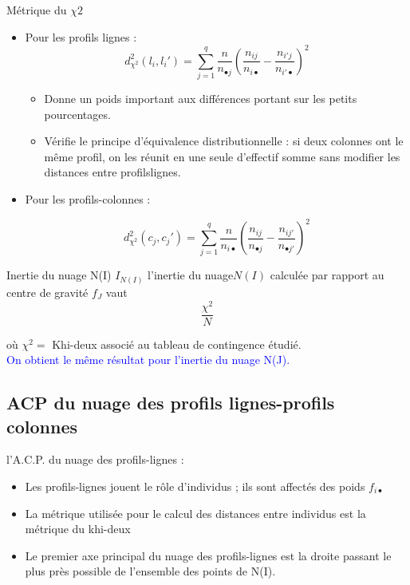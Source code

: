 \documentclass[11pt]{beamer}
\begin{document}
\begin{frame}{Métrique du $\chi 2$}

\begin{itemize}
\item Pour les profils lignes :\\

$$d^2_{\chi^2}(l_i,l_i')=\sum_{j=1}^{q}\frac{n}{n_{\bullet j}}(\frac{n_{ij}}{n_{i \bullet}}-\frac{n_{i'j}}{n_{i' \bullet}})^2  $$

\begin{itemize}
\item Donne un poids important aux différences portant sur les
petits pourcentages.
\item  Vérifie le principe d’équivalence distributionnelle : si deux
colonnes ont le même profil, on les réunit en une seule
d’effectif somme sans modifier les distances entre profilslignes.
\end{itemize}

\item Pour les profils-colonnes :

$$d^2_{\chi^2}(c_j,c_j')=\sum_{j=1}^{q}\frac{n}{n_{i \bullet }}(\frac{n_{ij}}{n_{\bullet j}}-\frac{n_{ij'}}{n_{ \bullet j'}})^2  $$       
       
\end{itemize}
\end{frame}
\begin{frame}{Inertie du nuage N(I)}
$I_{N(I)}$  l’inertie du nuage$ N(I)$ calculée par rapport
au centre de gravité $f_J$ vaut $$\frac{\chi^2}{N}$$

où $\chi^2=$ Khi-deux associé au tableau de contingence étudié.\\

\textcolor{blue}{On obtient le même résultat pour l’inertie du nuage N(J).}

\end{frame}
\subsection{ACP du nuage des profils lignes-profils colonnes }
\begin{frame}{l’A.C.P. du nuage des profils-lignes :}
\begin{itemize}

\item Les profils-lignes jouent le rôle d’individus ; ils sont
affectés des poids $f_{i\bullet}$
\item La métrique utilisée pour le calcul des distances entre
individus est la métrique du khi-deux

\item Le premier axe principal du nuage des profils-lignes est la droite passant le plus près possible de l'ensemble des points
de N(I).
\end{itemize}
\end{frame}
\end{document}
